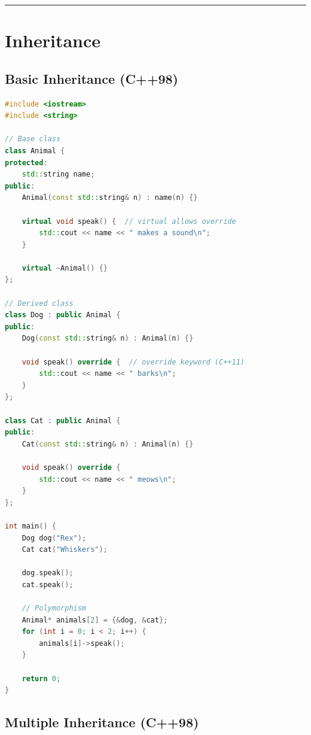 \begin{center}\rule{0.5\linewidth}{0.5pt}\end{center}

\hypertarget{inheritance}{%
\section{Inheritance}\label{inheritance}}

\hypertarget{basic-inheritance-c98}{%
\subsection{Basic Inheritance (C++98)}\label{basic-inheritance-c98}}

\begin{lstlisting}[language={C++}]
#include <iostream>
#include <string>

// Base class
class Animal {
protected:
    std::string name;
public:
    Animal(const std::string& n) : name(n) {}
    
    virtual void speak() {  // virtual allows override
        std::cout << name << " makes a sound\n";
    }
    
    virtual ~Animal() {}
};

// Derived class
class Dog : public Animal {
public:
    Dog(const std::string& n) : Animal(n) {}
    
    void speak() override {  // override keyword (C++11)
        std::cout << name << " barks\n";
    }
};

class Cat : public Animal {
public:
    Cat(const std::string& n) : Animal(n) {}
    
    void speak() override {
        std::cout << name << " meows\n";
    }
};

int main() {
    Dog dog("Rex");
    Cat cat("Whiskers");
    
    dog.speak();
    cat.speak();
    
    // Polymorphism
    Animal* animals[2] = {&dog, &cat};
    for (int i = 0; i < 2; i++) {
        animals[i]->speak();
    }
    
    return 0;
}
\end{lstlisting}

\hypertarget{multiple-inheritance-c98}{%
\subsection{Multiple Inheritance
(C++98)}\label{multiple-inheritance-c98}}

